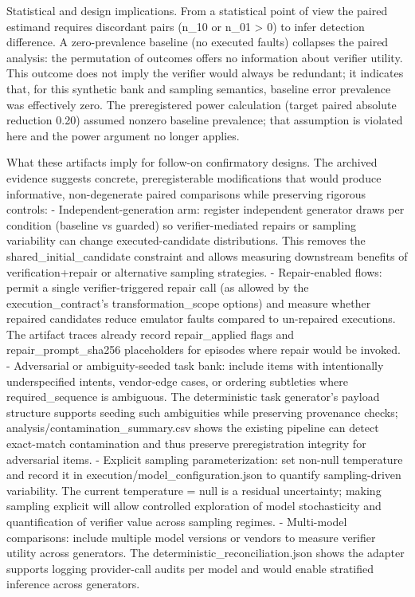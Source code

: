 \documentclass[conference]{IEEEtran}
\begin{document}
Statistical and design implications. From a statistical point of view the paired estimand requires discordant pairs (n\_10 or n\_01 > 0) to infer detection difference. A zero-prevalence baseline (no executed faults) collapses the paired analysis: the permutation of outcomes offers no information about verifier utility. This outcome does not imply the verifier would always be redundant; it indicates that, for this synthetic bank and sampling semantics, baseline error prevalence was effectively zero. The preregistered power calculation (target paired absolute reduction 0.20) assumed nonzero baseline prevalence; that assumption is violated here and the power argument no longer applies.

What these artifacts imply for follow-on confirmatory designs. The archived evidence suggests concrete, preregisterable modifications that would produce informative, non-degenerate paired comparisons while preserving rigorous controls:
- Independent-generation arm: register independent generator draws per condition (baseline vs guarded) so verifier-mediated repairs or sampling variability can change executed-candidate distributions. This removes the shared\_initial\_candidate constraint and allows measuring downstream benefits of verification+repair or alternative sampling strategies.
- Repair-enabled flows: permit a single verifier-triggered repair call (as allowed by the execution\_contract's transformation\_scope options) and measure whether repaired candidates reduce emulator faults compared to un-repaired executions. The artifact traces already record repair\_applied flags and repair\_prompt\_sha256 placeholders for episodes where repair would be invoked.
- Adversarial or ambiguity-seeded task bank: include items with intentionally underspecified intents, vendor-edge cases, or ordering subtleties where required\_sequence is ambiguous. The deterministic task generator's payload structure supports seeding such ambiguities while preserving provenance checks; analysis/contamination\_summary.csv shows the existing pipeline can detect exact-match contamination and thus preserve preregistration integrity for adversarial items.
- Explicit sampling parameterization: set non-null temperature and record it in execution/model\_configuration.json to quantify sampling-driven variability. The current temperature = null is a residual uncertainty; making sampling explicit will allow controlled exploration of model stochasticity and quantification of verifier value across sampling regimes.
- Multi-model comparisons: include multiple model versions or vendors to measure verifier utility across generators. The deterministic\_reconciliation.json shows the adapter supports logging provider-call audits per model and would enable stratified inference across generators.
\end{document}

